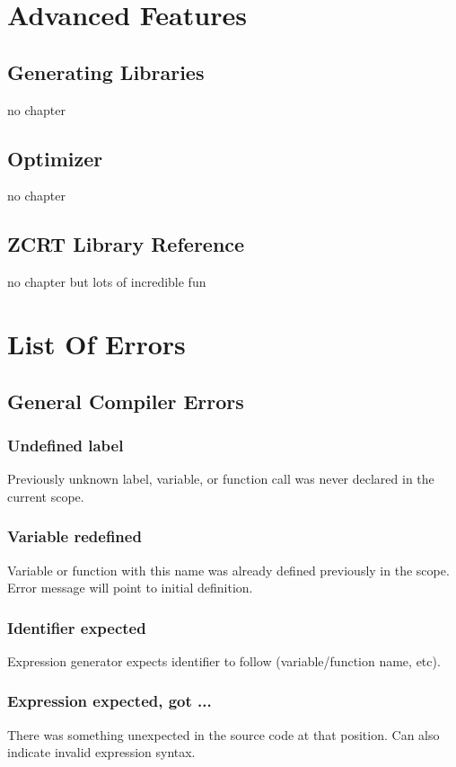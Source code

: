 \section{Advanced Features}
\subsection{Generating Libraries} \label{libgen}
no chapter
\subsection{Optimizer} \label{optimizer}
no chapter
\subsection{ZCRT Library Reference} \label{zcrtlib}
no chapter but lots of incredible fun


\section{List Of Errors}
\subsection{General Compiler Errors}
\subsubsection{Undefined label}
Previously unknown label, variable, or function call was never declared in the current scope.

\subsubsection{Variable redefined}
Variable or function with this name was already defined previously in the scope. Error message will point to initial definition.

\subsubsection{Identifier expected}
Expression generator expects identifier to follow (variable/function name, etc).

\subsubsection{Expression expected, got ...}
There was something unexpected in the source code at that position. Can also indicate invalid expression syntax.

